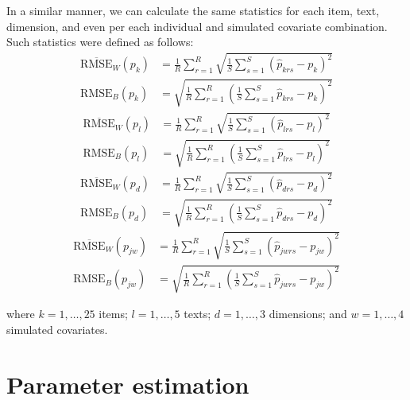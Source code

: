 In a similar manner, we can calculate the same statistics for each item, text, dimension, and even per each individual and simulated covariate combination. Such statistics were defined as follows:
%
\begin{align}
	\overline{\text{RMSE}}_{W} \left( p_{k} \right) &= \frac{1}{R} \sum_{r=1}^{R} \sqrt{ \frac{1}{S} \sum_{s=1}^{S} \left( \hat{p}_{krs} - p_{k} \right)^2} \\
	\text{RMSE}_{B} \left( p_{k} \right) &= \sqrt{ \frac{1}{R} \sum_{r=1}^{R}  \left( \frac{1}{S} \sum_{s=1}^{S} \hat{p}_{krs} - p_{k} \right)^2} 
\end{align}
%
\begin{align}
	\overline{\text{RMSE}}_{W} \left( p_{l} \right) &= \frac{1}{R} \sum_{r=1}^{R} \sqrt{ \frac{1}{S} \sum_{s=1}^{S} \left( \hat{p}_{lrs} - p_{l} \right)^2} \\
	\text{RMSE}_{B} \left( p_{l} \right) &= \sqrt{ \frac{1}{R} \sum_{r=1}^{R}  \left( \frac{1}{S} \sum_{s=1}^{S} \hat{p}_{lrs} - p_{l} \right)^2} 
\end{align}
%
\begin{align}
	\overline{\text{RMSE}}_{W} \left( p_{d} \right) &= \frac{1}{R} \sum_{r=1}^{R} \sqrt{ \frac{1}{S} \sum_{s=1}^{S} \left( \hat{p}_{drs} - p_{d} \right)^2} \\
	\text{RMSE}_{B} \left( p_{d} \right) &= \sqrt{ \frac{1}{R} \sum_{r=1}^{R}  \left( \frac{1}{S} \sum_{s=1}^{S} \hat{p}_{drs} - p_{d} \right)^2} 
\end{align}
%
\begin{align}
	\overline{\text{RMSE}}_{W} \left( p_{jw} \right) &= \frac{1}{R} \sum_{r=1}^{R} \sqrt{ \frac{1}{S} \sum_{s=1}^{S} \left( \hat{p}_{jwrs} - p_{jw} \right)^2} \\
	\text{RMSE}_{B} \left( p_{jw} \right) &= \sqrt{ \frac{1}{R} \sum_{r=1}^{R}  \left( \frac{1}{S} \sum_{s=1}^{S} \hat{p}_{jwrs} - p_{jw} \right)^2} 
\end{align}

\noindent where $k= 1, \dots, 25$ items; $l=1, \dots, 5$ texts; $d=1, \dots ,3$ dimensions; and $w=1, \dots, 4$ simulated covariates.


\section{Parameter estimation}

